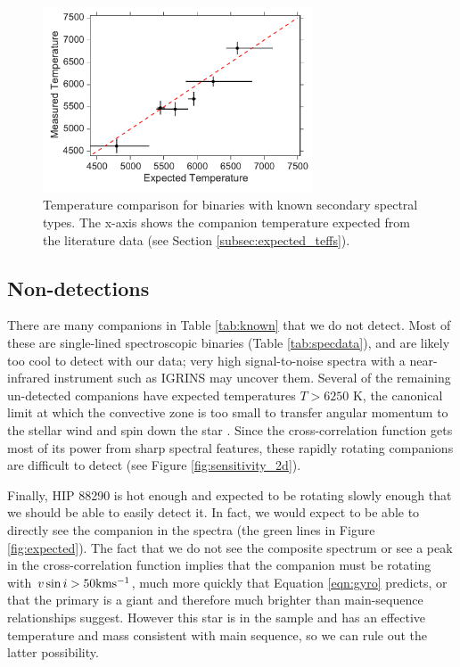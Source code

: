 \documentclass{emulateapj}
\begin{document}
\begin{figure}
        \centering
        \includegraphics[width=80mm]{Known_Binaries.pdf}
        
        \caption{Temperature comparison for binaries with known secondary spectral types. The x-axis shows the companion temperature expected from the literature data (see Section \ref{subsec:expected_teffs}).}
         \label{fig:known}
\end{figure}


\subsection{Non-detections}
\label{sec:nondetections}
There are many companions in Table \ref{tab:known} that we do not detect. Most of these are single-lined spectroscopic binaries (Table \ref{tab:specdata}), and are likely too cool to detect with our data; very high signal-to-noise spectra with a near-infrared instrument such as IGRINS may uncover them. Several of the remaining un-detected companions have expected temperatures $T  > 6250$ K, the canonical limit at which the convective zone is too small to transfer angular momentum to the stellar wind and spin down the star \citep{Pinsonneault2001}. Since the cross-correlation function gets most of its power from  sharp spectral features, these rapidly rotating companions are difficult to detect (see Figure \ref{fig:sensitivity_2d}).  

Finally, HIP 88290 is hot enough and expected to be rotating slowly enough that we should be able to easily detect it. In fact, we would expect to be able to directly see the companion in the spectra (the green lines in Figure \ref{fig:expected}). The fact that we do not see the composite spectrum or see a peak in the cross-correlation function implies that the companion must be rotating with $v\sin{i} > 50 \rm km s^{-1}$, much more quickly that Equation \ref{eqn:gyro} predicts, or that the primary is a giant and therefore much brighter than main-sequence relationships suggest. However this star is in the \cite{David2015} sample and has an effective temperature and mass consistent with main sequence, so we can rule out the latter possibility. 
\end{document}

